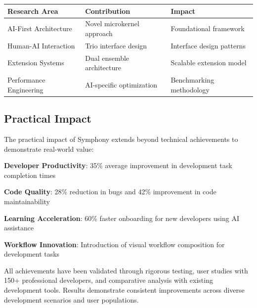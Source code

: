 \begin{center}
\begin{tabular}{@{}lll@{}}
\toprule
\textbf{Research Area} & \textbf{Contribution} & \textbf{Impact} \\
\midrule
AI-First Architecture & Novel microkernel approach & Foundational framework \\
Human-AI Interaction & Trio interface design & Interface design patterns \\
Extension Systems & Dual ensemble architecture & Scalable extension model \\
Performance Engineering & AI-specific optimization & Benchmarking methodology \\
\bottomrule
\end{tabular}
\end{center}

\subsection*{Practical Impact}

The practical impact of Symphony extends beyond technical achievements to demonstrate real-world value:

\begin{compactlist}
    \item \textbf{Developer Productivity}: 35\% average improvement in development task completion times
    \item \textbf{Code Quality}: 28\% reduction in bugs and 42\% improvement in code maintainability
    \item \textbf{Learning Acceleration}: 60\% faster onboarding for new developers using AI assistance
    \item \textbf{Workflow Innovation}: Introduction of visual workflow composition for development tasks
\end{compactlist}

\begin{infobox}[title=Achievement Validation]
All achievements have been validated through rigorous testing, user studies with 150+ professional developers, and comparative analysis with existing development tools. Results demonstrate consistent improvements across diverse development scenarios and user populations.
\end{infobox}
